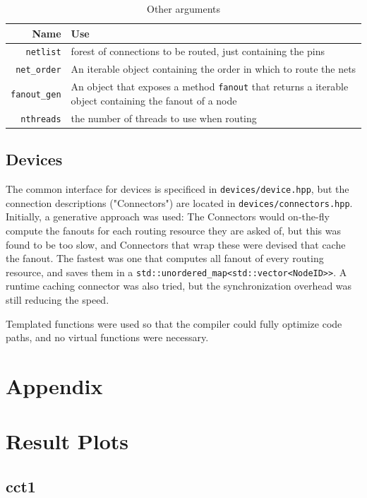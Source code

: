 \documentclass[11pt]{article}
\begin{document}
\begin{table}[H]
\centering
\begin{tabular}{r | p{12cm}}
\hline\hline
Name & Use \\
\hline
\texttt{netlist}       & forest of connections to be routed, just containing the pins \\
\texttt{net_order}     & An iterable object containing the order in which to route the nets \\
\texttt{fanout_gen}    & An object that exposes a method \texttt{fanout} that returns a iterable object containing the fanout of a node \\
\texttt{nthreads}      & the number of threads to use when routing \\
\hline\hline
\end{tabular}
\caption{Other arguments}\label{tab:route-all-args}
\end{table}


\subsection{Devices}
The common interface for devices is specificed in \texttt{devices/device.hpp}, but the connection descriptions ("Connectors") are located in \texttt{devices/connectors.hpp}. Initially, a generative approach was used: The Connectors would on-the-fly compute the fanouts for each routing resource they are asked of, but this was found to be too slow, and Connectors that wrap these were devised that cache the fanout. The fastest was one that computes all fanout of every routing resource, and saves them in a \texttt{std::unordered_map<std::vector<NodeID>>}. A runtime caching connector was also tried, but the synchronization overhead was still reducing the speed.

Templated functions were used so that the compiler could fully optimize code paths, and no virtual functions were necessary.

\clearpage
\appendix
\section*{Appendix}

\section{Result Plots}\label{app:result-plots}
\subsection{cct1}
\end{document}
